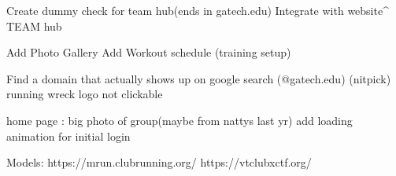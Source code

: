 
Create dummy check for team hub(ends in gatech.edu)
Integrate with website^ TEAM hub

Add Photo Gallery
Add Workout schedule (training setup)

Find a domain that actually shows up on google search (@gatech.edu)
(nitpick) running wreck logo not clickable

home page :
    big photo of group(maybe from nattys last yr)
    add loading animation for initial login


Models: https://mrun.clubrunning.org/
        https://vtclubxctf.org/